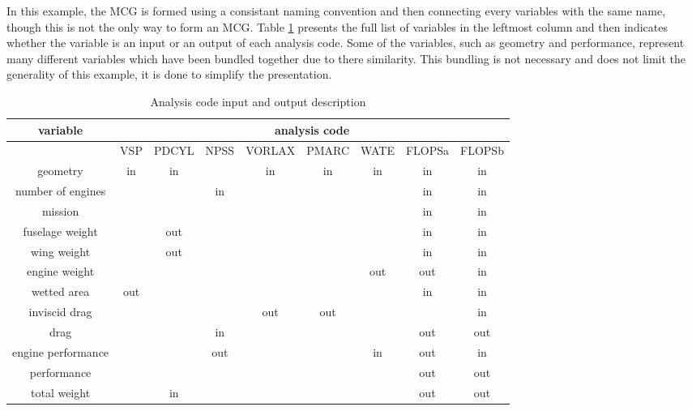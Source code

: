 In this example, the MCG is formed using a consistant naming convention and then connecting every variables with the same name, though this is not the only way to form an MCG. Table \ref{t:ins and outs} presents the full list of variables in the leftmost column and then indicates whether the variable is an input or an output of each analysis code. Some of the variables, such as geometry and performance, represent many different variables which have been bundled together due to there similarity. This bundling is not necessary and does not limit the generality of this example, it is done to simplify the presentation.
\begin{table}[htb!]
  \centering
  \caption{Analysis code input and output description}
    \begin{tabular}{ccccccccc}
    \toprule
    variable & \multicolumn{8}{c}{analysis code} \\
    \midrule
          & VSP   & PDCYL & NPSS  & VORLAX & PMARC & WATE  & FLOPSa & FLOPSb \\
    geometry & in    & in    &       & in    & in    & in    & in    & in \\
    number of engines &       &       & in    &       &       &       & in    & in \\
    mission &       &       &       &       &       &       & in    & in \\
    fuselage weight &       & out   &       &       &       &       & in    & in \\
    wing weight &       & out   &       &       &       &       & in    & in \\
    engine weight &       &       &       &       &       & out   & out   & in \\
    wetted area & out   &       &       &       &       &       & in    & in \\
    inviscid drag &       &       &       & out   & out   &       &       & in \\
    drag  &       &       & in    &       &       &       & out   & out \\
    engine performance &       &       & out   &       &       & in    & out   & in \\
    performance &       &       &       &       &       &       & out   & out \\
    total weight &       & in    &       &       &       &       & out   & out \\
    \bottomrule
    \end{tabular}
  \label{t:ins and outs}
\end{table}

